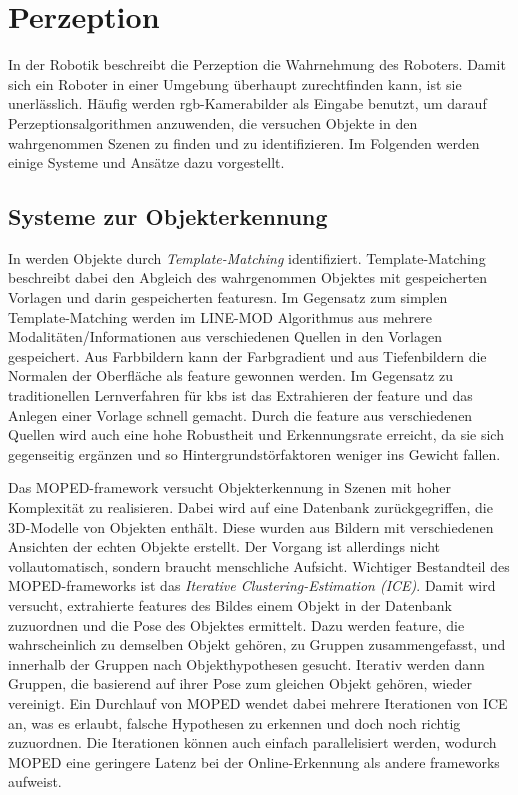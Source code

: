 \section{Perzeption}
In der Robotik beschreibt die Perzeption die Wahrnehmung des Roboters. Damit sich ein Roboter in einer Umgebung überhaupt zurechtfinden kann, ist sie unerlässlich. Häufig werden \gls{rgb}-Kamerabilder als Eingabe benutzt, um darauf Perzeptionsalgorithmen anzuwenden, die versuchen Objekte in den wahrgenommen Szenen zu finden und zu identifizieren. Im Folgenden werden einige Systeme und Ansätze dazu vorgestellt.

\subsection{Systeme zur Objekterkennung}

In \cite{multimodalTemplate} werden Objekte durch \textit{Template-Matching} identifiziert. Template-Matching beschreibt dabei den Abgleich des wahrgenommen Objektes mit gespeicherten Vorlagen und darin gespeicherten \glspl{feature}n. Im Gegensatz zum simplen Template-Matching werden im LINE-MOD Algorithmus aus \cite{multimodalTemplate} mehrere Modalitäten/Informationen aus verschiedenen Quellen in den Vorlagen gespeichert. Aus Farbbildern kann der Farbgradient und aus Tiefenbildern die Normalen der Oberfläche als \gls{feature} gewonnen werden. Im Gegensatz zu traditionellen Lernverfahren für \glspl{kb} ist das Extrahieren der \gls{feature} und das Anlegen einer Vorlage schnell gemacht. Durch die \gls{feature} aus verschiedenen Quellen wird auch eine hohe Robustheit und Erkennungsrate erreicht, da sie sich gegenseitig ergänzen und so Hintergrundstörfaktoren weniger ins Gewicht fallen. \par

Das MOPED-\gls{framework} \cite{moped} versucht Objekterkennung in Szenen mit hoher Komplexität zu realisieren. Dabei wird auf eine Datenbank zurückgegriffen, die 3D-Modelle von Objekten enthält. Diese wurden aus Bildern mit verschiedenen Ansichten der echten Objekte erstellt. Der Vorgang ist allerdings nicht vollautomatisch, sondern braucht menschliche Aufsicht. Wichtiger Bestandteil des MOPED-\glspl{framework} ist das \textit{Iterative Clustering-Estimation (ICE)}. Damit wird versucht, extrahierte \glspl{feature} des Bildes einem Objekt in der Datenbank zuzuordnen und die Pose des Objektes ermittelt. Dazu werden \gls{feature}, die wahrscheinlich zu demselben Objekt gehören, zu Gruppen zusammengefasst, und innerhalb der Gruppen nach Objekthypothesen gesucht. Iterativ werden dann Gruppen, die basierend auf ihrer Pose zum gleichen Objekt gehören, wieder vereinigt. Ein Durchlauf von MOPED wendet dabei mehrere Iterationen von ICE an, was es erlaubt, falsche Hypothesen zu erkennen und doch noch richtig zuzuordnen. Die Iterationen können auch einfach parallelisiert werden, wodurch MOPED eine geringere Latenz bei der Online-Erkennung als andere \glspl{framework} aufweist.  \par

